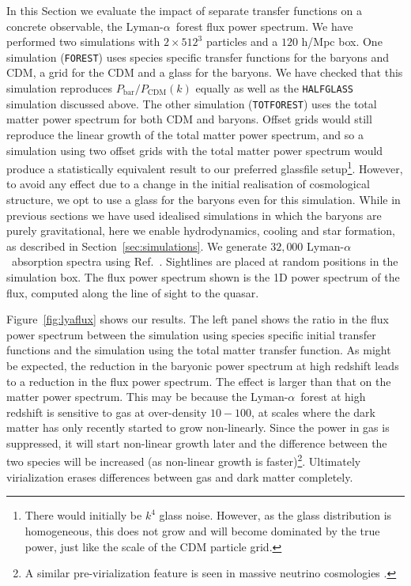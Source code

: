 \documentclass[a4paper,11pt]{article}
\newcommand{\Lya}{Lyman-$\alpha$}
\begin{document}
In this Section we evaluate the impact of separate transfer functions on a concrete observable, the \Lya~forest flux power spectrum. We have performed two simulations with $2\times 512^3$ particles and a $120$ h/Mpc box. One simulation (\texttt{FOREST}) uses species specific transfer functions for the baryons and CDM, a grid for the CDM and a glass for the baryons. We have checked that this simulation reproduces $P_\mathrm{bar}/P_\mathrm{CDM}(k)$ equally as well as the \texttt{HALFGLASS} simulation discussed above.
The other simulation (\texttt{TOTFOREST}) uses the total matter power spectrum for both CDM and baryons. Offset grids would still reproduce the linear growth of the total matter power spectrum, and so a simulation using two offset grids with the total matter power spectrum would produce a statistically equivalent result to our preferred glassfile setup\footnote{There would initially be $k^4$ glass noise. However, as the glass distribution is homogeneous, this does not grow and will become dominated by the true power, just like the scale of the CDM particle grid.}. However, to avoid any effect due to a change in the initial realisation of cosmological structure, we opt to use a glass for the baryons even for this simulation. While in previous sections we have used idealised simulations in which the baryons are purely gravitational, here we enable hydrodynamics, cooling and star formation, as described in Section~\ref{sec:simulations}. We generate $32,000$ \Lya~absorption spectra using Ref.~\cite{FSFE}. Sightlines are placed at random positions in the simulation box. The flux power spectrum shown is the 1D power spectrum of the flux, computed along the line of sight to the quasar.

Figure~\ref{fig:lyaflux} shows our results. The left panel shows the ratio in the flux power spectrum between the simulation using species specific initial transfer functions and the simulation using the total matter transfer function. As might be expected, the reduction in the baryonic power spectrum at high redshift leads to a reduction in the flux power spectrum. The effect is larger than that on the matter power spectrum. This may be because the \Lya~forest at high redshift is sensitive to gas at over-density $10-100$, at scales where the dark matter has only recently started to grow non-linearly. Since the power in gas is suppressed, it will start non-linear growth later and the difference between the two species will be increased (as non-linear growth is faster)\footnote{A similar pre-virialization feature is seen in massive neutrino cosmologies \cite{Bird:2012}.}. Ultimately virialization erases differences between gas and dark matter completely.
\end{document}
